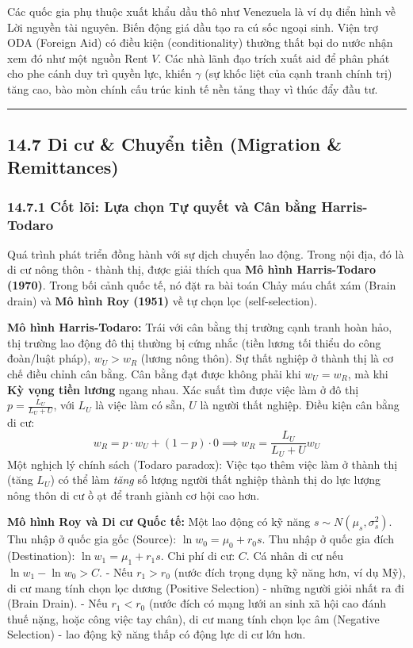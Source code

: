 \documentclass[
]{article}
\begin{document}
Các quốc gia phụ thuộc xuất khẩu dầu thô như Venezuela là ví dụ điển
hình về Lời nguyền tài nguyên. Biến động giá dầu tạo ra cú sốc ngoại
sinh. Viện trợ ODA (Foreign Aid) có điều kiện (conditionality) thường
thất bại do nước nhận xem đó như một nguồn Rent \(V\). Các nhà lãnh đạo
trích xuất aid để phân phát cho phe cánh duy trì quyền lực, khiến
\(\gamma\) (sự khốc liệt của cạnh tranh chính trị) tăng cao, bào mòn
chính cấu trúc kinh tế nền tảng thay vì thúc đẩy đầu tư.

\begin{center}\rule{0.5\linewidth}{0.5pt}\end{center}

\subsection{14.7 Di cư \& Chuyển tiền (Migration \&
Remittances)}\label{di-cux1b0-chuyux1ec3n-tiux1ec1n-migration-remittances}

\subsubsection{14.7.1 Cốt lõi: Lựa chọn Tự quyết và Cân bằng
Harris-Todaro}\label{cux1ed1t-luxf5i-lux1ef1a-chux1ecdn-tux1ef1-quyux1ebft-vuxe0-cuxe2n-bux1eb1ng-harris-todaro}

Quá trình phát triển đồng hành với sự dịch chuyển lao động. Trong nội
địa, đó là di cư nông thôn - thành thị, được giải thích qua \textbf{Mô
hình Harris-Todaro (1970)}. Trong bối cảnh quốc tế, nó đặt ra bài toán
Chảy máu chất xám (Brain drain) và \textbf{Mô hình Roy (1951)} về tự
chọn lọc (self-selection).

\textbf{Mô hình Harris-Todaro:} Trái với cân bằng thị trường cạnh tranh
hoàn hảo, thị trường lao động đô thị thường bị cứng nhắc (tiền lương tối
thiểu do công đoàn/luật pháp), \(w_U > w_R\) (lương nông thôn). Sự thất
nghiệp ở thành thị là cơ chế điều chỉnh cân bằng. Cân bằng đạt được
không phải khi \(w_U = w_R\), mà khi \textbf{Kỳ vọng tiền lương} ngang
nhau. Xác suất tìm được việc làm ở đô thị \(p = \frac{L_U}{L_U + U}\),
với \(L_U\) là việc làm có sẵn, \(U\) là người thất nghiệp. Điều kiện
cân bằng di cư:
\[ w_R = p \cdot w_U + (1 - p) \cdot 0 \implies w_R = \frac{L_U}{L_U + U} w_U \]
Một nghịch lý chính sách (Todaro paradox): Việc tạo thêm việc làm ở
thành thị (tăng \(L_U\)) có thể làm \emph{tăng} số lượng người thất
nghiệp thành thị do lực lượng nông thôn di cư ồ ạt để tranh giành cơ hội
cao hơn.

\textbf{Mô hình Roy và Di cư Quốc tế:} Một lao động có kỹ năng
\(s \sim N(\mu_s, \sigma_s^2)\). Thu nhập ở quốc gia gốc (Source):
\(\ln w_0 = \mu_0 + r_0 s\). Thu nhập ở quốc gia đích (Destination):
\(\ln w_1 = \mu_1 + r_1 s\). Chi phí di cư: \(C\). Cá nhân di cư nếu
\(\ln w_1 - \ln w_0 > C\). - Nếu \(r_1 > r_0\) (nước đích trọng dụng kỹ
năng hơn, ví dụ Mỹ), di cư mang tính chọn lọc dương (Positive Selection)
- những người giỏi nhất ra đi (Brain Drain). - Nếu \(r_1 < r_0\) (nước
đích có mạng lưới an sinh xã hội cao đánh thuế nặng, hoặc công việc tay
chân), di cư mang tính chọn lọc âm (Negative Selection) - lao động kỹ
năng thấp có động lực di cư lớn hơn.
\end{document}
